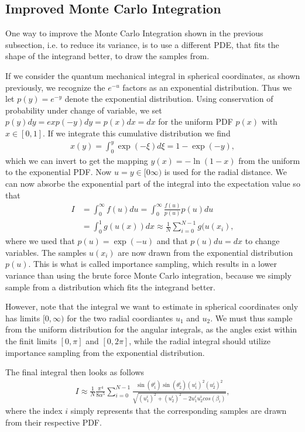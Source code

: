 \documentclass[twocolumn]{aastex62}
\begin{document}
\subsection{Improved Monte Carlo Integration}
One way to improve the Monte Carlo Integration shown in the previous subsection, i.e. to reduce its variance, is to use a different PDE, that fits the shape of the integrand better, to draw the samples from.

If we consider the quantum mechanical integral in spherical coordinates, as shown previously, we recognize the $e^{-u}$ factors as an exponential distribution. Thus we let $p(y) = e^{-y}$ denote the exponential distribution. Using conservation of probability under change of variable, we set $p(y)dy = exp(-y)dy = p(x)dx = dx$ for the uniform PDF $p(x)$ with $x\in[0,1]$. If we integrate this cumulative distribution we find 
\begin{align}
	x(y) = \int^y_0 \exp(-\xi)d\xi = 1 - \exp(-y),
\end{align} 
which we can invert to get the mapping $y(x) = -\ln(1-x)$ from the uniform to the exponential PDF. Now $u = y\in[0\infty)$ is used for the radial distance. We can now absorbe the exponential part of the integral into the expectation value so that 
\begin{align}
	I &= \int^\infty_0 f(u)du = \int_0^\infty \frac{f(u)}{p(u)}p(u)du \\
	&= \int^1_0 g(u(x))dx \approx \frac{1}{N}\sum_{i=0}^{N-1} g(u(x_i), 
\end{align}
where we used that $p(u) = \exp(-u)$ and that $p(u)du = dx$ to change variables. The samples $u(x_i)$ are now drawn from the exponential distribution $p(u)$. This is what is called importance sampling, which results in a lower variance than using the brute force Monte Carlo integration, because we simply sample from a distribution which fits the integrand better. 

However, note that the integral we want to estimate in spherical coordinates only has limits $[0, \infty)$ for the two radial coordiantes $u_1$ and $u_2$. We must thus sample from the uniform distribution for the angular integrals, as the angles exist within the finit limits $[0,\pi]$ and $[0, 2\pi]$, while the radial integral should utilize importance sampling from the exponential distribution.

The final integral then looks as follows
\begin{align}
	I \approx \frac{1}{N}\frac{\pi^4}{8\alpha^5}\sum^{N-1}_{i=0}\frac{\sin
	(\theta_1^i)\sin(\theta_2^i)(u_1^i)^2(u_2^i)^2}{\sqrt{(u_1^i)^2 + (u_2^i)^2 - 2u_1^iu_2^icos(\beta_i)}},
\end{align}
where the index $i$ simply represents that the corresponding samples are drawn from their respective PDF.
\end{document}
